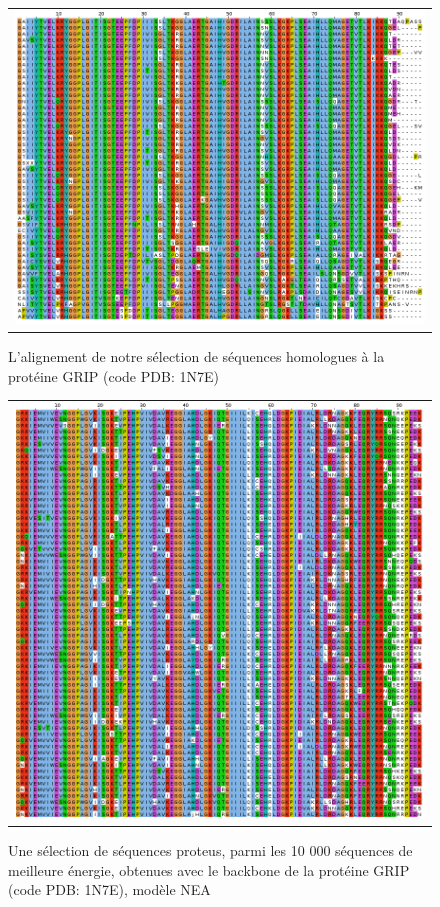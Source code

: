    \begin{figure}[t]
     \centering
     \begin{tabular}{c}
       \includegraphics[width=17cm]{homologues/1N7E.png} \\
     \end{tabular}
     \caption{L'alignement de notre sélection de séquences homologues à la protéine GRIP (code PDB: 1N7E)}
\label{align_homo:GRIP}
   \end{figure}

   \begin{figure}[t]
     \centering
     \begin{tabular}{c}
       \includegraphics[width=17cm]{proteus/1N7E.png} \\
     \end{tabular}
       \caption{Une sélection de séquences proteus, parmi les 10 000 séquences de meilleure énergie, obtenues avec le backbone de la protéine GRIP (code PDB: 1N7E), modèle NEA}
\label{align_proteus:GRIP}
   \end{figure}
\clearpage

